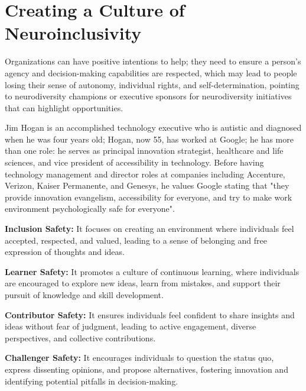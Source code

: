 \documentclass[main.tex]{subfiles}
\begin{document}
\section{Creating a Culture of Neuroinclusivity}

Organizations can have positive intentions to help; they need to ensure a person's agency and decision-making capabilities are respected, which may lead to people losing their sense of autonomy, individual rights, and self-determination, pointing to neurodiversity champions or executive sponsors for neurodiversity initiatives that can highlight opportunities. 

Jim Hogan is an accomplished technology executive who is autistic and diagnosed when he was four years old; Hogan, now 55, has worked at Google; he has more than one role: he serves as principal innovation strategist, healthcare and life sciences, and vice president of accessibility in technology. Before having technology management and director roles at companies including Accenture, Verizon, Kaiser Permanente, and Genesys, he values Google stating that "they provide innovation evangelism, accessibility for everyone, and try to make work environment psychologically safe for everyone". 



    \textbf{Inclusion Safety:}   It focuses on creating an environment where individuals feel accepted, respected, and valued, leading to a sense of belonging and free expression of thoughts and ideas.

     \textbf{Learner Safety:}  It promotes a culture of continuous learning, where individuals are encouraged to explore new ideas, learn from mistakes, and support their pursuit of knowledge and skill development.

     \textbf{Contributor Safety:}  It ensures individuals feel confident to share insights and ideas without fear of judgment, leading to active engagement, diverse perspectives, and collective contributions.

     \textbf{Challenger Safety:} It encourages individuals to question the status quo, express dissenting opinions, and propose alternatives, fostering innovation and identifying potential pitfalls in decision-making.


\newpage
\end{document}
